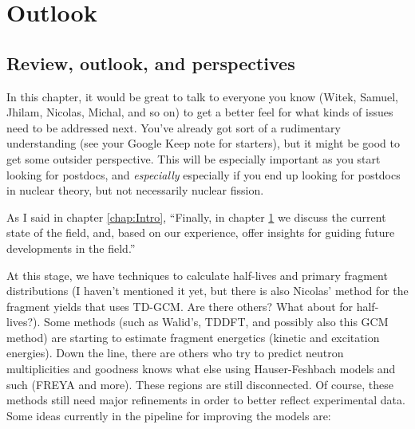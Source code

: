 \chapter{Outlook}\label{chap:Outlook}

\section{Review, outlook, and perspectives}

In this chapter, it would be great to talk to everyone you know (Witek, Samuel, Jhilam, Nicolas, Michal, and so on) to get a better feel for what kinds of issues need to be addressed next. You've already got sort of a rudimentary understanding (see your Google Keep note for starters), but it might be good to get some outsider perspective. This will be especially important as you start looking for postdocs, and \textit{especially} especially if you end up looking for postdocs in nuclear theory, but not necessarily nuclear fission.

As I said in chapter \ref{chap:Intro}, ``Finally, in chapter \ref{chap:Outlook} we discuss the current state of the field, and, based on our experience, offer insights for guiding future developments in the field.''

At this stage, we have techniques to calculate half-lives and primary fragment distributions (I haven't mentioned it yet, but there is also Nicolas' method for the fragment yields that uses TD-GCM. Are there others? What about for half-lives?). Some methods (such as Walid's, TDDFT, and possibly also this GCM method) are starting to estimate fragment energetics (kinetic and excitation energies). Down the line, there are others who try to predict neutron multiplicities and goodness knows what else using Hauser-Feshbach models and such (FREYA and more). These regions are still disconnected. Of course, these methods still need major refinements in order to better reflect experimental data. Some ideas currently in the pipeline for improving the models are:

